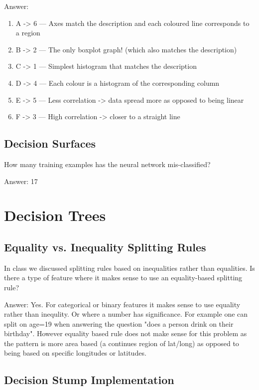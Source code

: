 \documentclass{article}
\def\ans#1{\par\gre{Answer: #1}}
\def\blu#1{{\color{blu}#1}}
\def\gre#1{{\color{gre}#1}}
\begin{document}
\ans{
	\begin{enumerate}
		\item A -> 6 --- Axes match the description and each coloured line corresponds to a region
		\item B -> 2 --- The only boxplot graph! (which also matches the description)
		\item C -> 1 --- Simplest histogram that matches the description
		\item D -> 4 --- Each colour is a histogram of the corresponding column
		\item E -> 5 --- Less correlation -> data spread more as opposed to being linear
		\item F -> 3 --- High correlation -> closer to a straight line
	\end{enumerate}
}

\subsection{Decision Surfaces}

\blu{How many training examples has the neural network mis-classified?}
\ans{
	17
}


\section{Decision Trees}

\subsection{Equality vs. Inequality Splitting Rules}

In class we discussed splitting rules based on inequalities rather than equalities. \blu{Is there a type of feature where it makes sense to use 
an equality-based splitting rule?}

\ans{
	Yes. For categorical or binary features it makes sense to use equality rather than inequlity. Or where a number has significance. For example one can split on age=19 when answering the question "does a person drink on their birthday". However equality based rule does not make sense for this problem as the pattern is more area based (a continues region of lat/long) as opposed to being based on specific longitudes or latitudes.
}

\subsection{Decision Stump Implementation}
\end{document}
